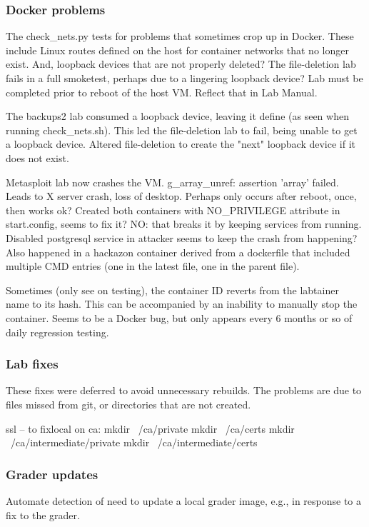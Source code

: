 \documentclass[12pt]{article}
\begin{document}
\subsubsection{Docker problems}
The check\_nets.py tests for problems that sometimes crop up in Docker.  These include Linux routes defined
on the host for container networks that no longer exist.  And, loopback devices that are not properly deleted?
The file-deletion lab fails in a full smoketest, perhaps due to a lingering loopback device?
Lab must be completed prior to reboot of the host VM. Reflect that in Lab Manual.

The backups2 lab consumed a loopback device, leaving it define (as seen when running check\_nets.sh).  This
led the file-deletion lab to fail, being unable to get a loopback device.  Altered file-deletion to create the
"next" loopback device if it does not exist.

Metasploit lab now crashes the VM.  g\_array\_unref: assertion 'array' failed.   Leads to X server crash, loss of
desktop.  Perhaps only occurs after reboot, once, then works ok?  Created both containers with NO\_PRIVILEGE attribute
in start.config, seems to fix it?  NO: that breaks it by keeping services from running.  Disabled postgresql service
in attacker seems to keep the crash from happening?  Also happened in a hackazon container derived from a dockerfile that
included multiple CMD entries (one in the latest file, one in the parent file).

Sometimes (only see on testing), the container ID reverts from the labtainer name to its hash.  This can be accompanied by an
inability to manually stop the container. Seems to be a Docker bug, but only appears every 6 months or so of daily regression testing.

\subsubsection{Lab fixes}
These fixes were deferred to avoid unnecessary rebuilds.  The problems are due to 
files missed from git, or directories that are not created.

ssl -- to fixlocal on ca:
    mkdir ~/ca/private
    mkdir ~/ca/certs
    mkdir ~/ca/intermediate/private
    mkdir ~/ca/intermediate/certs

\subsubsection{Grader updates}
Automate detection of need to update a local grader image, e.g., in response to a fix to the grader.
\end{document}
